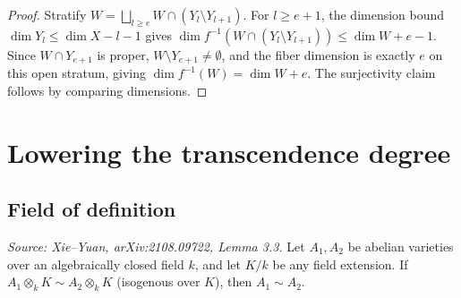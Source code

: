 \begin{proof}
  Stratify \(W = \bigsqcup_{l \geq e} W \cap (Y_l \setminus Y_{l+1})\).
  For \(l \geq e+1\), the dimension bound \(\dim Y_l \leq \dim X - l - 1\) gives
  \(\dim f^{-1}(W \cap (Y_l \setminus Y_{l+1})) \leq \dim W + e - 1\).
  Since \(W \cap Y_{e+1}\) is proper, \(W \setminus Y_{e+1} \neq \emptyset\), and the fiber
  dimension is exactly \(e\) on this open stratum, giving \(\dim f^{-1}(W) = \dim W + e\).
  The surjectivity claim follows by comparing dimensions.
\end{proof}


\section{Lowering the transcendence degree}
\label{sec:trdeg}

\subsection{Field of definition}

\begin{lemma}
  \label{lem:isoBaseChange}
  \uses{}
  \textit{Source: Xie--Yuan, arXiv:2108.09722, Lemma 3.3.}
  Let \(A_1, A_2\) be abelian varieties over an algebraically closed field \(k\), and let
  \(K/k\) be any field extension.
  If \(A_1 \otimes_k K \sim A_2 \otimes_k K\) (isogenous over \(K\)), then \(A_1 \sim A_2\).
\end{lemma}

